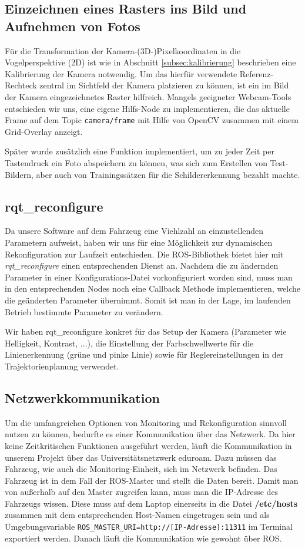\subsection{Einzeichnen eines Rasters ins Bild und Aufnehmen von Fotos}
F\"ur die Transformation der Kamera-(3D-)Pixelkoordinaten in die Vogelperspektive (2D) ist wie in Abschnitt \ref{subsec:kalibrierung} beschrieben eine Kalibrierung der Kamera notwendig.
Um das hierf\"ur verwendete Referenz-Rechteck zentral im Sichtfeld der Kamera
platzieren zu k\"onnen, ist ein im Bild der Kamera eingezeichnetes Raster hilfreich.
Mangels geeigneter Webcam-Tools entschieden wir uns, eine eigene Hilfs-Node
zu implementieren, die das aktuelle Frame auf dem Topic
\texttt{camera/frame} mit Hilfe von OpenCV
zusammen mit einem Grid-Overlay anzeigt.

Sp\"ater wurde zus\"atzlich eine Funktion implementiert, um zu jeder Zeit per
Tastendruck ein Foto abspeichern zu k\"onnen, was sich zum Erstellen von Test-Bildern,
aber auch von Trainingss\"atzen f\"ur die Schildererkennung bezahlt machte.

\subsection{rqt\_reconfigure}
Da unsere Software auf dem Fahrzeug eine Viehlzahl an einzustellenden Parametern aufweist, haben wir uns f\"ur eine M\"oglichkeit zur dynamischen Rekonfiguration zur Laufzeit entschieden. Die ROS-Bibliothek bietet hier mit \textit{rqt\_reconfigure}\cite{reconfigure} einen entsprechenden Dienst an. Nachdem die zu \"andernden Parameter in einer Konfigurations-Datei vorkonfiguriert worden sind, muss man in den entsprechenden Nodes noch eine Callback Methode implementieren, welche die ge\"anderten Parameter \"ubernimmt. Somit ist man in der Lage, im laufenden Betrieb bestimmte Parameter zu ver\"andern.

Wir haben rqt\_reconfigure konkret f\"ur das Setup der Kamera (Parameter wie Helligkeit, Kontrast, ...), die Einstellung der Farbschwellwerte f\"ur die Linienerkennung (gr\"une und pinke Linie) sowie f\"ur Reglereinstellungen in der Trajektorienplanung verwendet.

\subsection{Netzwerkkommunikation}
Um die umfangreichen Optionen von Monitoring und Rekonfiguration sinnvoll nutzen zu k\"onnen, bedurfte es einer Kommunikation \"uber das Netzwerk. Da hier keine Zeitkritischen Funktionen ausgef\"uhrt werden, l\"auft die Kommunikation in unserem Projekt \"uber das Universit\"atsnetzwerk eduroam. Dazu m\"ussen das Fahrzeug, wie auch die Monitoring-Einheit, sich im Netzwerk befinden. Das Fahrzeug ist in dem Fall der ROS-Master und stellt die Daten bereit. Damit man von au\ss erhalb auf den Master zugreifen kann, muss man die IP-Adresse des Fahrzeugs wissen. Diese muss auf dem Laptop einerseits in die Datei \textbf{/etc/hosts} zusammen mit dem entsprechenden Host-Namen eingetragen sein und als Umgebungsvariable \texttt{ROS\_MASTER\_URI=http://[IP-Adresse]:11311} im Terminal exportiert werden. Danach l\"auft die Kommunikation wie gewohnt \"uber ROS.

